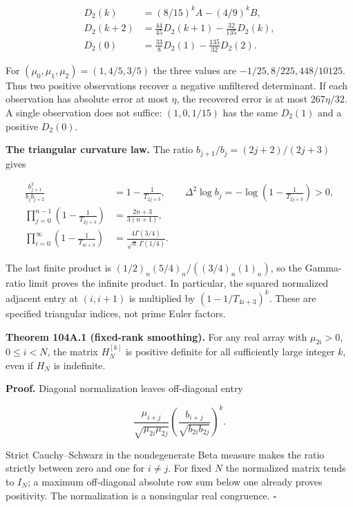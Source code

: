 \documentclass[
  11pt,
]{book}
\begin{document}
\[
\begin{aligned}
D_2(k)&=(8/15)^k A-(4/9)^k B,\\
D_2(k+2)&=\tfrac{44}{45}D_2(k+1)-\tfrac{32}{135}D_2(k),\\
D_2(0)&=\tfrac{33}{8}D_2(1)-\tfrac{135}{32}D_2(2).
\end{aligned}
\tag{104A.2}
\]

For \((\mu_0,\mu_1,\mu_2)=(1,4/5,3/5)\) the three values are
\(-1/25,8/225,448/10125\). Thus two positive observations recover a
negative unfiltered determinant. If each observation has absolute error
at most \(\eta\), the recovered error is at most \(267\eta/32\). A
single observation does not suffice: \((1,0,1/15)\) has the same
\(D_2(1)\) and a positive \(D_2(0)\).

\textbf{The triangular curvature law.} The ratio
\(b_{j+1}/b_j=(2j+2)/(2j+3)\) gives

\[
\begin{aligned}
\frac{b_{j+1}^2}{b_jb_{j+2}}&=1-\frac1{T_{2j+3}},\qquad
\Delta^2\log b_j=-\log\left(1-\frac1{T_{2j+3}}\right)>0,\\
\prod_{j=0}^{n-1}\left(1-\frac1{T_{2j+3}}\right)
 &=\frac{2n+3}{3(n+1)},\\
\prod_{i=0}^{\infty}\left(1-\frac1{T_{4i+3}}\right)
 &=\frac{4\Gamma(3/4)}{\sqrt\pi\,\Gamma(1/4)}.
\end{aligned}
\tag{104A.3}
\]

The last finite product is \((1/2)_n(5/4)_n/((3/4)_n(1)_n)\), so the
Gamma-ratio limit proves the infinite product. In particular, the
squared normalized adjacent entry at \((i,i+1)\) is multiplied by
\((1-1/T_{4i+3})^k\). These are specified triangular indices, not prime
Euler factors.

\textbf{Theorem 104A.1 (fixed-rank smoothing).} For any real array with
\(\mu_{2i}>0\), \(0\le i<N\), the matrix \(H_N^{[k]}\) is positive
definite for all sufficiently large integer \(k\), even if \(H_N\) is
indefinite.

\textbf{Proof.} Diagonal normalization leaves off-diagonal entry

\[
\frac{\mu_{i+j}}{\sqrt{\mu_{2i}\mu_{2j}}}
 \left(\frac{b_{i+j}}{\sqrt{b_{2i}b_{2j}}}\right)^k.
\]

Strict Cauchy--Schwarz in the nondegenerate Beta measure makes the ratio
strictly between zero and one for \(i\ne j\). For fixed \(N\) the
normalized matrix tends to \(I_N\); a maximum off-diagonal absolute row
sum below one already proves positivity. The normalization is a
nonsingular real congruence. \(\square\)
\end{document}
